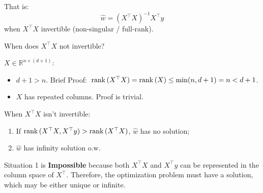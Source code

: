 \documentclass[../main]{subfiles}
\begin{document}
That is:
\begin{equation}
    \hat w=(X^\top X)^{-1}X^\top y
\end{equation}
when $X^\top X$ invertible (non-singular / full-rank).
\begin{example}
  When does $X^\top X$ not invertible?
\end{example}
\begin{solution}
  $X\in \mathbb R^{n\times(d+1)}$:
\begin{itemize}
  \item $d+1>n.$ Brief Proof: $\, {\mathrm{rank}\,} (X^\top X)={\mathrm{rank}\,} (X)\le\min(n,d+1)=n<d+1$.
  \item $X$ has repeated columns. Proof is trivial.
\end{itemize}
\end{solution}

\vspace{1em}
When $X^\top X$ isn't invertible:
\begin{enumerate}
  \item If ${\mathrm{rank}\,} (X^\top X, X^\top y)>{\mathrm{rank}\,} (X^\top X)$, $\hat w$ has no solution; 
  \item $\hat w$ has infinity solution o.w.
\end{enumerate}
Situation 1 is \textbf{Impossible} because both $X^\top X$ and $X^\top y$ can be represented in the column space of $X^\top$. Therefore, the optimization problem must have a solution, which may be either unique or infinite.
\end{document}
